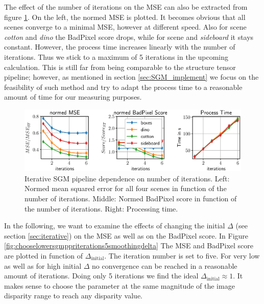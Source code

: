 \documentclass  [
  paper    = a4,
  BCOR     = 10mm,
  twoside,
  fontsize = 12pt,
  fleqn,
  toc      = bibnumbered,
  toc      = listofnumbered,
  numbers  = noendperiod,
  headings = normal,
  listof   = leveldown,
  version  = 3.03
]                                       {scrreprt}
\begin{document}
The effect of the number of iterations on the MSE can also be extracted from figure \ref{fig:chooselowersgmpprmergeiterations}. On the left, the normed MSE is plotted. It becomes obvious that all scenes converge to a minimal MSE, however at different speed. Also for scene \textit{cotton} and \textit{dino} the BadPixel score drops, while for scene  and \textit{sideboard} it stays constant. However, the process time increases linearly with the number of iterations. Thus we stick to a maximum of 5 iterations in the upcoming calculation. This is still far from being comparable to the structure tensor pipeline; however, as mentioned in section \ref{sec:SGM_implement} we focus on the feasibility of such method and try to adapt the process time to a reasonable amount of time for our measuring purposes.
\begin{figure}[h!]
	\centering
	\includegraphics[width=1\linewidth]{images/choose_lower_sgm_ppr_merge_iterations}
	\caption[Iterative SGM dependence on number of iterations]{Iterative SGM pipeline dependence on number of iterations. Left: Normed mean squared error for all four scenes in function  of the number of iterations. Middle: Normed BadPixel score in function of the number of iterations. Right: Processing time.}
	\label{fig:chooselowersgmpprmergeiterations}
\end{figure}

In the following, we want to examine the effects of changing the initial $\Delta$ (see section \ref{sec:iterative}) on the MSE as well as on the BadPixel score. In Figure \ref{fig:chooselowersgmppriterations5smoothingdelta} The MSE and BadPixel score are plotted in function of $\Delta_\text{initial}$. The iteration number is set to five. For very low as well as for high initial $\Delta$ no convergence can be reached in a reasonable amount of iterations. Doing only 5 iterations we find the ideal $\Delta_\text{initial} \approx 1$. It makes sense to choose the parameter at the same magnitude of the image disparity range to reach any disparity value.
\end{document}

